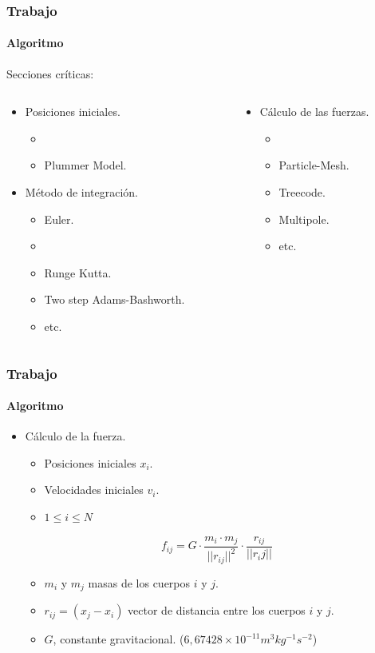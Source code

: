 \frame
{
\frametitle{Trabajo}
\framesubtitle{Algoritmo}
Secciones críticas:
\begin{columns}
	\begin{column}{0.5\textwidth}
		\begin{itemize}	
			\item Posiciones iniciales.
			\begin{itemize}
				\item {}
				\item Plummer Model.
			\end{itemize}
			\item Método de integración.
			\begin{itemize}
				\item Euler.
				\item {}
				\item Runge Kutta.
				\item Two step Adams-Bashworth.
				\item etc.
			\end{itemize}
		\end{itemize}
	\end{column}
	\begin{column}{0.5\textwidth}
		\begin{itemize}
			\item Cálculo de las fuerzas.
			\begin{itemize}
				\item {} 
				\item Particle-Mesh.  
				\item Treecode. 
				\item Multipole. 
				\item etc.
			\end{itemize}
		\end{itemize}
	\end{column}
\end{columns}
}

\frame
{
\frametitle{Trabajo}
\framesubtitle{Algoritmo}

\begin{itemize}
	\item Cálculo de la fuerza.
	\begin{itemize}
		\item Posiciones iniciales $x_i$.
		\item Velocidades iniciales $v_i$.
		\item $1 \leq i \leq N$
	\end{itemize}
	$$f_{ij} =G \cdot \frac{m_i \cdot m_j}{||r_{ij}||^{2}} \cdot \frac{r_{ij}}{||r_ij||}$$
	\begin{itemize}
		\item $m_i$ y $m_j$ masas de los cuerpos $i$ y $j$.
		\item $r_{ij} = (x_j - x_i )$ vector de distancia entre los cuerpos $i$ y $j$.
		\item $G$, constante gravitacional. ($6,67428 \times 10^{-11} m^{3} kg^{-1} s^{-2}$)
	\end{itemize}
\end{itemize}
}

